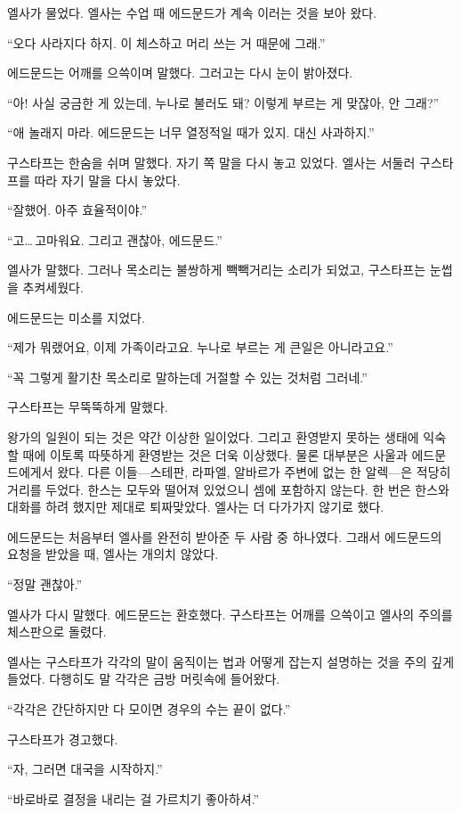 엘사가 물었다. 엘사는 수업 때 에드문드가 계속 이러는 것을 보아 왔다.

``오다 사라지다 하지. 이 체스하고 머리 쓰는 거 때문에 그래.''

에드문드는 어깨를 으쓱이며 말했다. 그러고는 다시 눈이 밝아졌다.

``아! 사실 궁금한 게 있는데, 누나로 불러도 돼? 이렇게 부르는 게 맞잖아, 안 그래?''

``애 놀래지 마라. 에드문드는 너무 열정적일 때가 있지. 대신 사과하지.''

구스타프는 한숨을 쉬며 말했다. 자기 쪽 말을 다시 놓고 있었다. 엘사는 서둘러 구스타프를 따라 자기 말을 다시 놓았다.

``잘했어. 아주 효율적이야.''

``고\ldots\,고마워요. 그리고 괜찮아, 에드문드.''

엘사가 말했다. 그러나 목소리는 불쌍하게 빽빽거리는 소리가 되었고, 구스타프는 눈썹을 추켜세웠다.

에드문드는 미소를 지었다.

``제가 뭐랬어요, 이제 가족이라고요. 누나로 부르는 게 큰일은 아니라고요.''

``꼭 그렇게 활기찬 목소리로 말하는데 거절할 수 있는 것처럼 그러네.''

구스타프는 무뚝뚝하게 말했다.

왕가의 일원이 되는 것은 약간 이상한 일이었다. 그리고 환영받지 못하는 생태에 익숙할 때에 이토록 따뜻하게 환영받는 것은 더욱 이상했다. 물론 대부분은 사울과 에드문드에게서 왔다. 다른 이들—스테판, 라파엘, 알바르가 주변에 없는 한 알렉—은 적당히 거리를 두었다. 한스는 모두와 떨어져 있었으니 셈에 포함하지 않는다. 한 번은 한스와 대화를 하려 했지만 제대로 퇴짜맞았다. 엘사는 더 다가가지 않기로 했다.

에드문드는 처음부터 엘사를 완전히 받아준 두 사람 중 하나였다. 그래서 에드문드의 요청을 받았을 때, 엘사는 개의치 않았다.

``정말 괜찮아.''

엘사가 다시 말했다. 에드문드는 환호했다. 구스타프는 어깨를 으쓱이고 엘사의 주의를 체스판으로 돌렸다.

엘사는 구스타프가 각각의 말이 움직이는 법과 어떻게 잡는지 설명하는 것을 주의 깊게 들었다. 다행히도 말 각각은 금방 머릿속에 들어왔다.

``각각은 간단하지만 다 모이면 경우의 수는 끝이 없다.''

구스타프가 경고했다.

``자, 그러면 대국을 시작하지.''

``바로바로 결정을 내리는 걸 가르치기 좋아하셔.''

